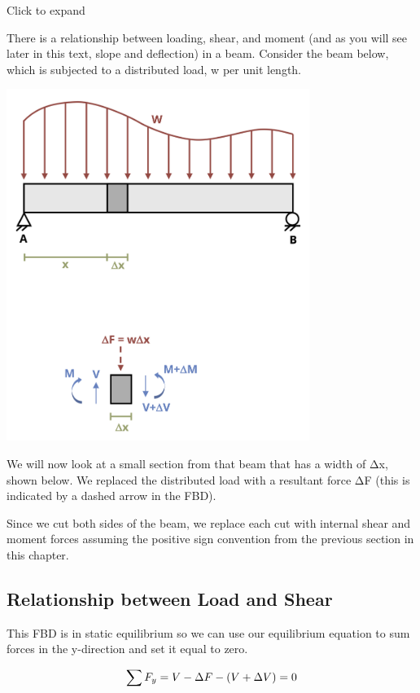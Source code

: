 \documentclass[
  letterpaper,
  DIV=11,
  numbers=noendperiod]{scrreprt}
\theoremstyle{definition}
\theoremstyle{remark}
\begin{document}
Click to expand

There is a relationship between loading, shear, and moment (and as you
will see later in this text, slope and deflection) in a beam. Consider
the beam below, which is subjected to a distributed load, w per unit
length.

\begin{center}
\includegraphics[width=3.875in,height=\textheight]{images/CH7 PNGs/figure 7.4.png}
\end{center}

We will now look at a small section from that beam that has a width of
Δx, shown below. We replaced the distributed load with a resultant force
ΔF (this is indicated by a dashed arrow in the FBD).

Since we cut both sides of the beam, we replace each cut with internal
shear and moment forces assuming the positive sign convention from the
previous section in this chapter.

\subsection{Relationship between Load and
Shear}\label{relationship-between-load-and-shear}

This FBD is in static equilibrium so we can use our equilibrium equation
to sum forces in the y-direction and set it equal to zero.

\[
\sum F_y=V-\Delta F-(V+\Delta V)=0 \\
\]
\end{document}
